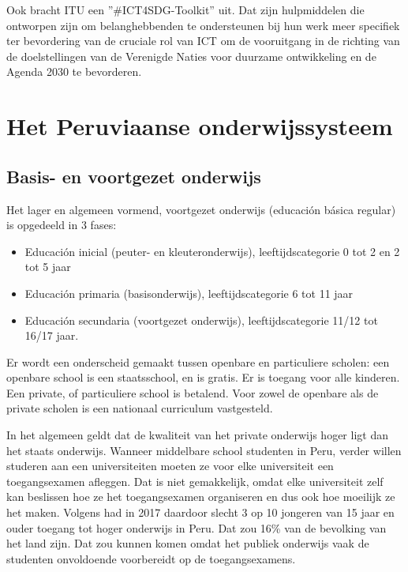 Ook bracht ITU een ''\#ICT4SDG-Toolkit'' uit. Dat zijn hulpmiddelen die ontworpen zijn om belanghebbenden te ondersteunen bij hun werk meer specifiek ter bevordering van de cruciale rol van ICT om de vooruitgang in de richting van de doelstellingen van de Verenigde Naties voor duurzame ontwikkeling en de Agenda 2030 te bevorderen. \autocite{ITU2015}
 
\section{Het Peruviaanse onderwijssysteem}
\subsection{Basis- en voortgezet onderwijs}
Het lager en algemeen vormend, voortgezet onderwijs (educación básica regular) is opgedeeld in 3 fases:
 \begin{itemize}
\item Educación inicial (peuter- en kleuteronderwijs), leeftijdscategorie 0 tot 2 en 2 tot 5 jaar
\item Educación primaria (basisonderwijs), leeftijdscategorie 6 tot 11 jaar
\item Educación secundaria (voortgezet onderwijs), leeftijdscategorie 11/12 tot 16/17 jaar.
\end{itemize}
Er wordt een onderscheid gemaakt tussen openbare en particuliere scholen: een openbare school is een staatsschool, en is gratis. Er is toegang voor alle kinderen. Een private, of particuliere school is betalend. Voor zowel de openbare als de private scholen is een nationaal curriculum vastgesteld.  \autocite{Nuffic2015}

In het algemeen geldt dat de kwaliteit van het private onderwijs hoger ligt dan het staats onderwijs. Wanneer middelbare school studenten in Peru, verder willen studeren aan een universiteiten moeten ze voor elke universiteit een toegangsexamen afleggen. Dat is niet gemakkelijk, omdat elke universiteit zelf kan beslissen hoe ze het toegangsexamen organiseren en dus ook hoe moeilijk ze het maken. Volgens \autocite{Repulbica2017} had in 2017 daardoor slecht 3 op 10 jongeren van 15 jaar en ouder toegang tot hoger onderwijs in Peru. Dat zou 16\% van de bevolking van het land zijn. \autocite{NoSeQueEstudiar2020} Dat zou kunnen komen omdat het publiek onderwijs vaak de studenten onvoldoende voorbereidt op de toegangsexamens.

